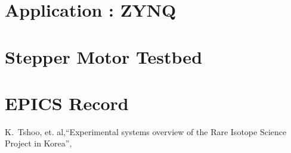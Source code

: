 \documentclass[11pt
-  , a4paper
  , article
  , oneside
]{memoir}
\begin{document}
\chapter{Application : ZYNQ  }

\chapter{Stepper Motor Testbed}

\chapter{EPICS Record}


	
	
\hfil\break


\clearpage
\vspace*{0.5cm}
\begin{thebibliography}{9}   %
 K.~Tshoo,{ et. al},``Experimental systems overview of the Rare Isotope Science Project in Korea'',
	
\end{thebibliography}
\end{document}
